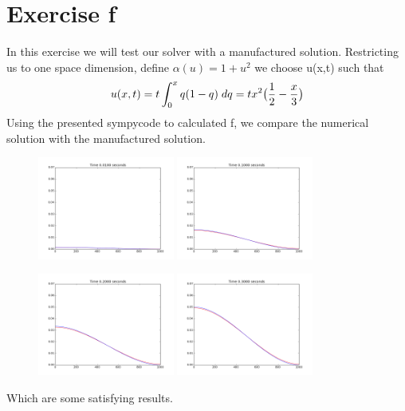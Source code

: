 \documentclass[a4paper,norsk]{article}
\begin{document}
\section*{Exercise f}
In this exercise we will test our solver with a manufactured solution. Restricting us to one space dimension, define 
$\alpha(u) = 1 + u^2$ we choose u(x,t) such that
\begin{align}
u(x,t) = t \int_0^x q(1-q)\hspace{1mm}dq = tx^2\big(\frac{1}{2} - \frac{x}{3} \big)
\end{align}
Using the presented sympycode to calculated f, we compare the numerical solution with the manufactured solution.

\begin{figure}[h!]
  \centering
    \includegraphics[width=0.4\textwidth]{framea.png}
    \includegraphics[width=0.4\textwidth]{frameb.png}
\end{figure}

\begin{figure}[h!]
    \centering
    \includegraphics[width=0.4\textwidth]{framec.png}
    \includegraphics[width=0.4\textwidth]{framed.png}
\end{figure}
Which are some satisfying results.
\end{document}
